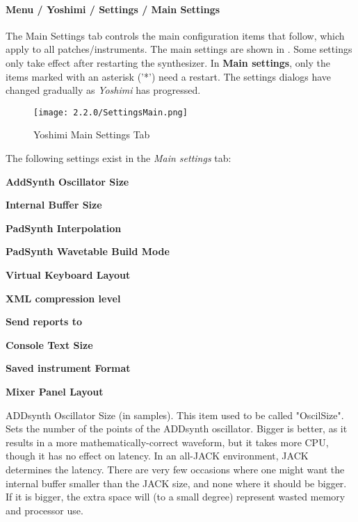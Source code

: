 \paragraph{Menu / Yoshimi / Settings / Main Settings}
\label{paragraph:menu_yoshimi_settings_main_settings}

   The Main Settings tab controls the main configuration items that
   follow, which apply to all patches/instruments.
   The main settings are shown in
   .
   Some settings only take effect after restarting the synthesizer.
   In \textbf{Main settings}, only the items marked with an asterisk ('*')
   need a restart.
   The settings dialogs have changed gradually as
   \textsl{Yoshimi} has progressed.

\begin{figure}[H]
   \centering
   \texttt{[image: 2.2.0/SettingsMain.png]}
   \caption{Yoshimi Main Settings Tab}
   \label{fig:yoshimi_main_settings_tab}
\end{figure}

   The following settings exist in the \textsl{Main settings} tab:

   \begin{enumber}
      \item \textbf{AddSynth Oscillator Size}
      \item \textbf{Internal Buffer Size}
      \item \textbf{PadSynth Interpolation}
      \item \textbf{PadSynth Wavetable Build Mode}
      \item \textbf{Virtual Keyboard Layout}
      \item \textbf{XML compression level}
      \item \textbf{Send reports to}
      \item \textbf{Console Text Size}
      \item \textbf{Saved instrument Format}
      \item \textbf{Mixer Panel Layout}
   \end{enumber}

   \setcounter{ItemCounter}{0}      %

   ADDsynth Oscillator Size (in samples).  This item used to be called
   "OscilSize".  Sets the number of the points of the ADDsynth oscillator.
   Bigger is better, as it results in a more mathematically-correct waveform,
   but it takes more CPU, though it has no effect on latency.
   In an all-JACK environment, JACK determines the latency.  There are very few
   occasions where one might want the internal buffer smaller than the JACK
   size, and none where it should be bigger. If it is bigger, the extra space
   will (to a small degree) represent wasted memory and processor use.

